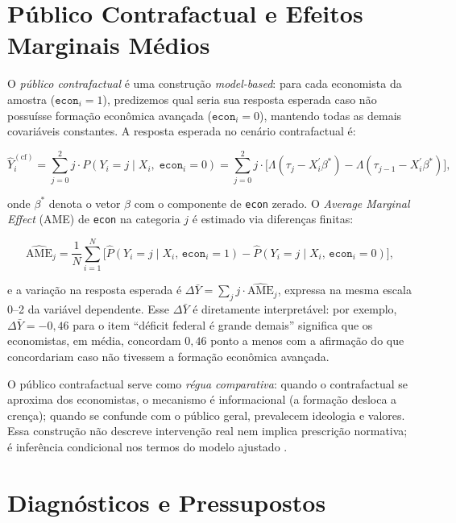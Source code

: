 \section{Público Contrafactual e Efeitos Marginais Médios}
\label{sec:publico_contrafactual}

O \textit{público contrafactual} é uma construção \textit{model-based}: para cada economista da amostra ($\texttt{econ}_i = 1$), predizemos qual seria sua resposta esperada caso não possuísse formação econômica avançada ($\texttt{econ}_i = 0$), mantendo todas as demais covariáveis constantes. A resposta esperada no cenário contrafactual é:

\begin{equation}\label{eq:contra_ord_v2}
\hat{Y}_i^{(\text{cf})} = \sum_{j=0}^{2} j \cdot P(Y_i = j \mid X_i,\; \texttt{econ}_i = 0)
= \sum_{j=0}^{2} j \cdot \bigl[\Lambda(\tau_j - X_i^\prime \beta^*) - \Lambda(\tau_{j-1} - X_i^\prime \beta^*)\bigr],
\end{equation}

onde $\beta^{*}$ denota o vetor $\beta$ com o componente de \texttt{econ} zerado. O \textit{Average Marginal Effect} (AME) de \texttt{econ} na categoria $j$ é estimado via diferenças finitas:

\begin{equation}\label{eq:ame_v2}
\widehat{\mathrm{AME}}_j = \frac{1}{N}\sum_{i=1}^{N}
\bigl[\hat{P}(Y_i=j \mid X_i,\,\texttt{econ}_i=1)
     - \hat{P}(Y_i=j \mid X_i,\,\texttt{econ}_i=0)\bigr],
\end{equation}

e a variação na resposta esperada é $\Delta\bar{Y} = \sum_j j \cdot \widehat{\mathrm{AME}}_j$, expressa na mesma escala 0--2 da variável dependente. Esse $\Delta\bar{Y}$ é diretamente interpretável: por exemplo, $\Delta\bar{Y} = -0{,}46$ para o item ``déficit federal é grande demais'' significa que os economistas, em média, concordam $0{,}46$ ponto a menos com a afirmação do que concordariam caso não tivessem a formação econômica avançada.

O público contrafactual serve como \emph{régua comparativa}: quando o contrafactual se aproxima dos economistas, o mecanismo é informacional (a formação desloca a crença); quando se confunde com o público geral, prevalecem ideologia e valores. Essa construção não descreve intervenção real nem implica prescrição normativa; é inferência condicional nos termos do modelo ajustado \cite{hausman2008}.

\section{Diagnósticos e Pressupostos}\label{sec:diagnosticos}

